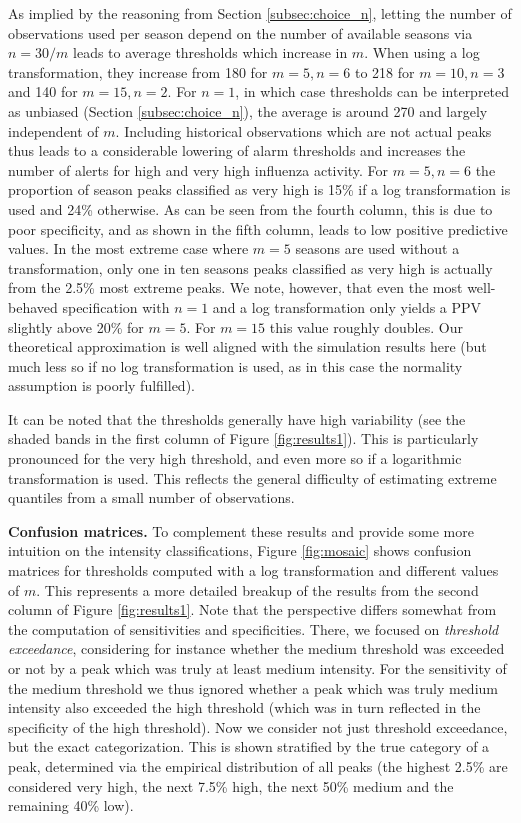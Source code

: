 \documentclass{article}
\begin{document}
As implied by the reasoning from Section \ref{subsec:choice_n}, letting the number of observations used per season depend on the number of available seasons via $n = 30/m$ leads to average thresholds which increase in $m$. When using a log transformation, they increase from 180 for $m = 5, n = 6$ to 218 for $m = 10, n = 3$ and 140 for $m = 15, n = 2$. For $n = 1$, in which case thresholds can be interpreted as unbiased (Section \ref{subsec:choice_n}), the average is around 270 and largely independent of $m$. Including historical observations which are not actual peaks thus leads to a considerable lowering of alarm thresholds and increases the number of alerts for high and very high influenza activity. For $m = 5, n = 6$ the proportion of season peaks classified as very high is 15\% if a log transformation is used and 24\% otherwise. As can be seen from the fourth column, this is due to poor specificity, and as shown in the fifth column, leads to low positive predictive values. In the most extreme case where $m = 5$ seasons are used without a transformation, only one in ten seasons peaks classified as very high is actually from the 2.5\% most extreme peaks. We note, however, that even the most well-behaved specification with $n = 1$ and a log transformation only yields a PPV slightly above 20\% for $m = 5$. For $m = 15$ this value roughly doubles. Our theoretical approximation is well aligned with the simulation results here (but much less so if no log transformation is used, as in this case the normality assumption is poorly fulfilled).


It can be noted that the thresholds generally have high variability (see the shaded bands in the first column of Figure \ref{fig:results1}). This is particularly pronounced for the very high threshold, and even more so if a logarithmic transformation is used. This reflects the general difficulty of estimating extreme quantiles from a small number of observations.

\textbf{Confusion matrices.} To complement these results and provide some more intuition on the intensity classifications, Figure \ref{fig:mosaic} shows confusion matrices for thresholds computed with a log transformation and different values of $m$. This represents a more detailed breakup of the results from the second column of Figure \ref{fig:results1}. Note that the perspective differs somewhat from the computation of sensitivities and specificities. There, we focused on \textit{threshold exceedance}, considering for instance whether the medium threshold was exceeded or not by a peak which was truly at least medium intensity. For the sensitivity of the medium threshold we thus ignored whether a peak which was truly medium intensity also exceeded the high threshold (which was in turn reflected in the specificity of the high threshold). Now we consider not just threshold exceedance, but the exact categorization. This is shown stratified by the true category of a peak, determined via the empirical distribution of all peaks (the highest 2.5\% are considered very high, the next 7.5\% high, the next 50\% medium and the remaining 40\% low).
\end{document}
